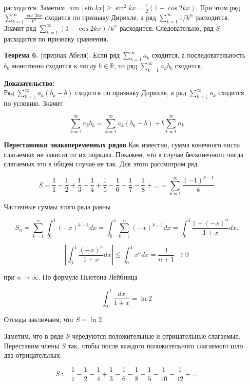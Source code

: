 \documentclass[a4paper,12pt]{article} %
\begin{document}
	расходится. Заметим, что $|\sin k x| \geq \sin ^{2} k x=\frac{1}{2}(1-\cos 2 k x)$. При этом ряд $\sum_{k=1}^{\infty} \frac{\cos 2 k x}{k^{\alpha}}$ сходится по признаку Дирихле, а ряд $\sum_{k=1}^{\infty} 1 / k^{\alpha}$ расходится. Значит ряд $\sum_{k=1}^{\infty}(1-\cos 2 k x) / k^{\alpha}$ расходится. Следовательно, ряд $\tilde{S}$ расходится по признаку сравнения.
	
	\textbf{Теорема 6.} (признак Абеля). Если ряд $\sum_{k=1}^{\infty} a_{k}$ сходится, а последовательность $b_{k}$ монотонно сходится к числу $b \in \mathbb{R}$, то ряд $\sum_{k=1}^{\infty} a_{k} b_{k}$ сходится.
	
	\textbf{Доказательство:\\}
	Ряд $\sum_{k=1}^{\infty} a_{k}\left(b_{k}-b\right)$ сходится по признаку Дирихле, а ряд $\sum_{k=1}^{\infty} a_{k}$ сходится по условию. Значит
	
	$$
	\sum_{k=1}^{\infty} a_{k} b_{k}=\sum_{k=1}^{\infty} a_{k}\left(b_{k}-b\right)+b \sum_{k=1}^{\infty} a_{k}
	$$
	
	\textbf{Перестановки знакопеременных рядов}
	Как известно, сумма конечного числа слагаемых не зависит от их порядка. Покажем, что в случае бесконечного числа слагаемых это в общем случае не так. Для этого рассмотрим ряд
	
	$$
	S=\frac{1}{1}-\frac{1}{2}+\frac{1}{3}-\frac{1}{4}+\frac{1}{5}-\frac{1}{6}+\frac{1}{7}-\frac{1}{8}+\ldots=\sum_{k=1}^{\infty} \frac{(-1)^{k-1}}{k}
	$$
	
	Частичные суммы этого ряда равны
	
	$$
	S_{n}=\sum_{k=1}^{n} \int_{0}^{1}(-x)^{k-1} d x=\int_{0}^{1} \sum_{k=1}^{n}(-x)^{k-1} d x=\int_{0}^{1} \frac{1+(-x)^{n}}{1+x} d x .
	$$
	
	$$
	\left|\int_{0}^{1} \frac{(-x)^{n}}{1+x} d x\right| \leq \int_{0}^{1} x^{n} d x=\frac{1}{n+1} \rightarrow 0
	$$
	
	при $n \rightarrow \infty$. По формуле Ньютона-Лейбница
	
	$$
	\int_{0}^{1} \frac{d x}{1+x}=\ln 2
	$$
	
	Отсюда заключаем, что $S=\ln 2$.
	
	Заметим, что в ряде $S$ чередуются положительные и отрицательные слагаемые. Переставим члены $S$ так, чтобы после каждого положительного слагаемого шло два отрицательных:
	
	$$
	\tilde{S}:=\frac{1}{1}-\frac{1}{2}-\frac{1}{4}+\frac{1}{3}-\frac{1}{6}-\frac{1}{8}+\frac{1}{5}-\frac{1}{10}-\frac{1}{12}+\ldots
	$$
	
\end{document}
